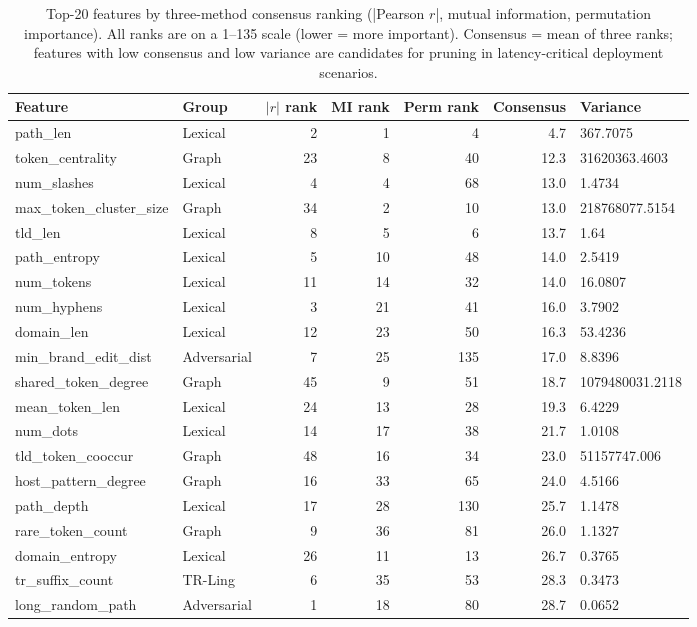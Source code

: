 \begin{table}[htbp]
\centering
\caption{Top-20 features by three-method consensus ranking (|Pearson $r$|, mutual information, permutation importance). All ranks are on a 1--135 scale (lower = more important). Consensus = mean of three ranks; features with low consensus and low variance are candidates for pruning in latency-critical deployment scenarios.}
\label{tab:feature_selection_summary}
\footnotesize
\begin{tabular}{llrrrrl}
\toprule
Feature & Group & $|r|$ rank & MI rank & Perm rank & Consensus & Variance \\
\midrule
path\_len & Lexical & 2 & 1 & 4 & 4.7 & 367.7075 \\
token\_centrality & Graph & 23 & 8 & 40 & 12.3 & 31620363.4603 \\
num\_slashes & Lexical & 4 & 4 & 68 & 13.0 & 1.4734 \\
max\_token\_cluster\_size & Graph & 34 & 2 & 10 & 13.0 & 218768077.5154 \\
tld\_len & Lexical & 8 & 5 & 6 & 13.7 & 1.64 \\
path\_entropy & Lexical & 5 & 10 & 48 & 14.0 & 2.5419 \\
num\_tokens & Lexical & 11 & 14 & 32 & 14.0 & 16.0807 \\
num\_hyphens & Lexical & 3 & 21 & 41 & 16.0 & 3.7902 \\
domain\_len & Lexical & 12 & 23 & 50 & 16.3 & 53.4236 \\
min\_brand\_edit\_dist & Adversarial & 7 & 25 & 135 & 17.0 & 8.8396 \\
shared\_token\_degree & Graph & 45 & 9 & 51 & 18.7 & 1079480031.2118 \\
mean\_token\_len & Lexical & 24 & 13 & 28 & 19.3 & 6.4229 \\
num\_dots & Lexical & 14 & 17 & 38 & 21.7 & 1.0108 \\
tld\_token\_cooccur & Graph & 48 & 16 & 34 & 23.0 & 51157747.006 \\
host\_pattern\_degree & Graph & 16 & 33 & 65 & 24.0 & 4.5166 \\
path\_depth & Lexical & 17 & 28 & 130 & 25.7 & 1.1478 \\
rare\_token\_count & Graph & 9 & 36 & 81 & 26.0 & 1.1327 \\
domain\_entropy & Lexical & 26 & 11 & 13 & 26.7 & 0.3765 \\
tr\_suffix\_count & TR-Ling & 6 & 35 & 53 & 28.3 & 0.3473 \\
long\_random\_path & Adversarial & 1 & 18 & 80 & 28.7 & 0.0652 \\
\bottomrule
\end{tabular}
\end{table}